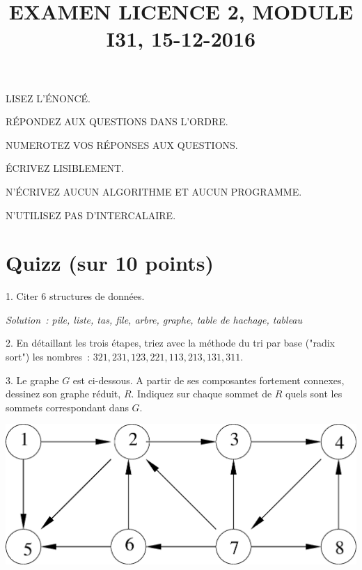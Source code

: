 \documentclass[11pt]{article}
\begin{document}
\title{EXAMEN LICENCE 2, MODULE I31, 15-12-2016}
\date{}

\maketitle
\newif\ifcorrige
\corrigetrue

\newcommand{\smallbullet}{\,\begin{picture}(-1,1)(-1,-3)\circle*{2}\end{picture}\ }


\begin{framed}
LISEZ L'\'ENONC\'E.

R\'EPONDEZ AUX QUESTIONS DANS L'ORDRE.

NUMEROTEZ VOS R\'EPONSES AUX  QUESTIONS.

\'ECRIVEZ LISIBLEMENT.

N'\'ECRIVEZ AUCUN ALGORITHME ET AUCUN PROGRAMME.

N'UTILISEZ PAS D'INTERCALAIRE.
\end{framed}

\section{Quizz (sur 10 points)}
1. Citer 6 structures de données.
 
\ifcorrige
{\it Solution~: pile, liste, tas, file, arbre, graphe, table de hachage, tableau}
\else
\fi

 
2. En détaillant les trois étapes, triez avec la méthode du tri par base ("radix sort") les nombres~:
$321, 231, 123, 221, 113, 213, 131, 311$.

 
3. Le graphe $G$ est ci-dessous. A partir de ses composantes fortement connexes, dessinez son graphe réduit, $R$. Indiquez sur chaque sommet de $R$ quels sont les sommets correspondant dans $G$.
\begin{center}
\includegraphics[width=0.6\linewidth]{scc.eps}
\end{center}
\end{document}
